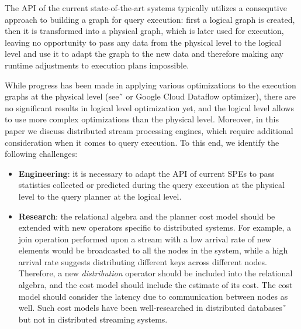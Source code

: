 The API of the current state-of-the-art systems typically utilizes a consequtive approach to building a graph for query execution: first a logical graph is created, then it is transformed into a physical graph, which is later used for execution, leaving no opportunity to pass any data from the physical level to the logical level and use it to adapt the graph to the new data and therefore making any runtime adjustments to execution plans impossible. 

While progress has been made in applying various optimizations to the execution graphs at the physical level (see˜\cite{grulich2020grizzly} or Google Cloud Dataflow optimizer), there are no significant results in logical level optimization yet, and the logical level allows to use more complex optimizations than the physical level. Moreover, in this paper we discuss distributed stream processing engines, which require additional consideration when it comes to query execution. To this end, we identify the following challenges:

\begin{itemize}
    \item \textbf{Engineering}: 
    it is necessary to adapt the API of current SPEs to pass statistics collected or predicted during the query execution at the physical level to the query planner at the logical level.
    
    \item \textbf{Research}: 
    the relational algebra and the planner cost model should be extended with new operators specific to distributed systems. For example, a join operation performed upon a stream with a low arrival rate of new elements would be broadcasted to all the nodes in the system, while a high arrival rate suggests distributing different keys across different nodes. Therefore, a new \textit{distribution} operator should be included into the relational algebra, and the cost model should include the estimate of its cost. The cost model should consider the latency due to communication between nodes as well. Such cost models have been well-researched in distributed databases˜\cite{kossmann2000thestate} but not in distributed streaming systems.
\end{itemize}




